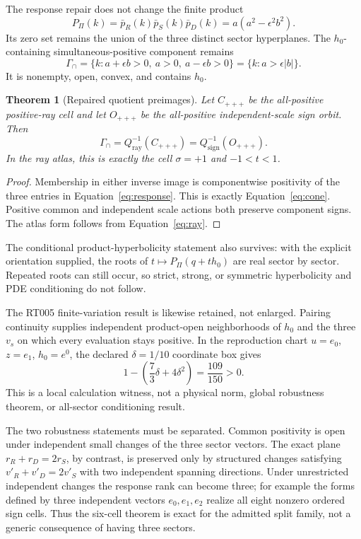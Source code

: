 \documentclass[11pt]{article}
\newtheorem{theorem}{Theorem}
\newcommand{\Qray}{Q_{\mathrm{ray}}}
\newcommand{\Qsign}{Q_{\mathrm{sign}}}
\newcommand{\GammaInt}{\Gamma_{\cap}}
\begin{document}
The response repair does not change the finite product
\[
 P_\Pi(k)=\bar p_R(k)\bar p_S(k)\bar p_D(k)
          =a(a^2-\epsilon^2b^2).
\]
Its zero set remains the union of the three distinct sector hyperplanes.  The
$h_0$-containing simultaneous-positive component remains
\begin{equation}\label{eq:cone}
 \GammaInt
 =\{k:a+\epsilon b>0,\ a>0,\ a-\epsilon b>0\}
 =\{k:a>\epsilon|b|\}.
\end{equation}
It is nonempty, open, convex, and contains $h_0$.

\clearpage
\begin{theorem}[Repaired quotient preimages]\label{thm:preimage}
Let $C_{+++}$ be the all-positive positive-ray cell and let $O_{+++}$ be the
all-positive independent-scale sign orbit.  Then
\[
 \GammaInt=\Qray^{-1}(C_{+++})
           =\Qsign^{-1}(O_{+++}).
\]
In the ray atlas, this is exactly the cell $\sigma=+1$ and $-1<t<1$.
\end{theorem}

\begin{proof}
Membership in either inverse image is componentwise positivity of the three
entries in Equation~\eqref{eq:response}.  This is exactly
Equation~\eqref{eq:cone}.  Positive common and independent scale actions both
preserve component signs.  The atlas form follows from
Equation~\eqref{eq:ray}.
\end{proof}

The conditional product-hyperbolicity statement also survives: with the
explicit orientation supplied, the roots of
$t\mapsto P_\Pi(q+t h_0)$ are real sector by sector.  Repeated roots can still
occur, so strict, strong, or symmetric hyperbolicity and PDE conditioning do
not follow.

The RT005 finite-variation result is likewise retained, not enlarged.  Pairing
continuity supplies independent product-open neighborhoods of $h_0$ and the
three $v_s$ on which every evaluation stays positive.  In the reproduction
chart $u=e_0$, $z=e_1$, $h_0=e^0$, the declared
$\delta=1/10$ coordinate box gives
\[
 1-\left(\frac73\delta+4\delta^2\right)=\frac{109}{150}>0.
\]
This is a local calculation witness, not a physical norm, global robustness
theorem, or all-sector conditioning result.

The two robustness statements must be separated.  Common positivity is open
under independent small changes of the three sector vectors.  The exact plane
$r_R+r_D=2r_S$, by contrast, is preserved only by structured changes satisfying
$v'_R+v'_D=2v'_S$ with two independent spanning directions.  Under unrestricted
independent changes the response rank can become three; for example the forms
defined by three independent vectors $e_0,e_1,e_2$ realize all eight nonzero
ordered sign cells.  Thus the six-cell theorem is exact for the admitted split
family, not a generic consequence of having three sectors.
\end{document}
